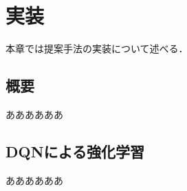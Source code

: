 \chapter{実装}
\label{implementation}

本章では提案手法の実装について述べる．

\section{概要}

ああああああ

\section{DQNによる強化学習}

ああああああ


